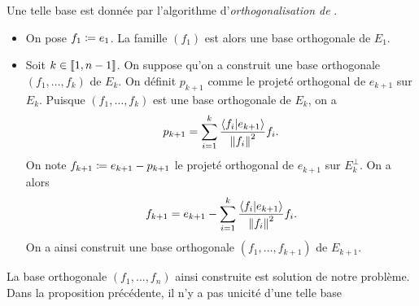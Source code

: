 \documentclass{magnolia}
\begin{document}
\begin{remarques}
\remarque Une telle base est donnée par l'algorithme d'\emph{orthogonalisation de }.
  \begin{itemize}
  \item On pose $f_1\coloneqq e_1$. La famille $(f_1)$ est alors une base orthogonale de $E_1$.
  \item Soit $k\in\left\llbracket 1,n-1\right\rrbracket$. On suppose qu'on a construit une base
    orthogonale $(f_1,\ldots,f_k)$ de $E_k$. On définit $p_{k+1}$ comme le projeté
    orthogonal de $e_{k+1}$ sur $E_k$. Puisque $(f_1,\ldots,f_k)$ est une base orthogonale
    de $E_k$, on a
    \[p_{k+1}= \sum_{i=1}^k \frac{\left\langle {f_i}\middle|{e_{k+1}}\right\rangle}{\left\|f_i\right\|^2} f_i.\]
    On note $f_{k+1}\coloneqq e_{k+1} - p_{k+1}$ le projeté orthogonal de $e_{k+1}$ sur
    $E_k^\perp$. On a alors
    \[f_{k+1}=e_{k+1} - \sum_{i=1}^k \frac{\left\langle {f_i}\middle|{e_{k+1}}\right\rangle}{\left\|f_i\right\|^2} f_i.\]
    On a ainsi construit une base orthogonale $(f_1,\ldots,f_{k+1})$ de $E_{k+1}$.
  \end{itemize}
  La base orthogonale $(f_1,\ldots,f_n)$ ainsi construite 
  est solution de notre problème.
\remarque Dans la proposition précédente, il n'y a pas unicité d'une telle base

\end{remarques}
\end{document}
